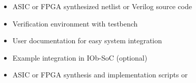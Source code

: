 \begin{itemize}
\item ASIC or FPGA synthesized netlist or Verilog source code
\item Verification environment with testbench
\item User documentation for easy system integration
\item Example integration in IOb-SoC (optional)
\item ASIC or FPGA synthesis and implementation scripts or
\end{itemize}
